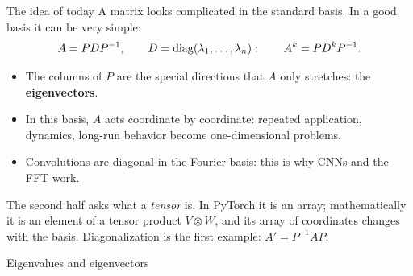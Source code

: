 \documentclass[aspectratio=1610,11pt]{beamer}
\begin{document}
\begin{frame}{The idea of today}
    \small
    A matrix looks complicated in the standard basis. In a good basis it can be very simple:
    \[A = PDP^{-1}, \qquad D = \operatorname{diag}(\lambda_1, \ldots, \lambda_n): \qquad A^k = PD^kP^{-1}.\]
    \begin{itemize}
        \item The columns of $P$ are the special directions that $A$ only stretches: the \textbf{eigenvectors}.
        \item In this basis, $A$ acts coordinate by coordinate: repeated application, dynamics, long-run behavior become one-dimensional problems.
        \item Convolutions are diagonal in the Fourier basis: this is why CNNs and the FFT work.
    \end{itemize}
    The second half asks what a \emph{tensor} is. In PyTorch it is an array; mathematically it is an element of a tensor product $V \otimes W$, and its array of coordinates changes with the basis. Diagonalization is the first example: $A' = P^{-1}AP$.
\end{frame}


\begin{frame}{Eigenvalues and eigenvectors}
\end{frame}
\end{document}
